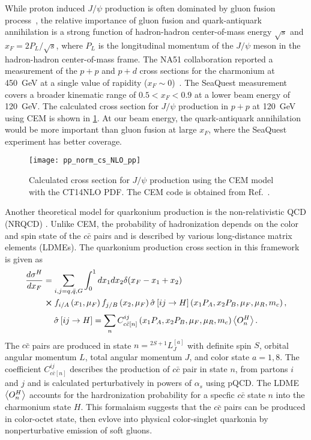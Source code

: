 \documentclass[../main.tex]{subfiles}
\begin{document}
While proton induced $J/\psi$ production is often dominated by gluon fusion
process~\cite{vogt1999}, the relative importance of gluon fusion
and quark-antiquark annihilation is a strong function of hadron-hadron center-of-mass energy $\sqrt{s}$
and $x_F=2P_L/\sqrt{s}$, where $P_L$ is the longitudinal momentum of the $J/\psi$ meson in the
hadron-hadron center-of-mass frame.
The NA51 collaboration reported a measurement of the $p+p$ and $p+d$ cross sections
for the charmonium at \SI{450}{\GeV} at a single value of rapidity ($x_F\sim 0$)~\cite{abreu1998}.
The SeaQuest measurement covers a broader kinematic range of $0.5<x_F<0.9$ at a lower beam energy
of \SI{120}{\GeV}.
The calculated cross section for $J/\psi$ production in $p+p$ at \SI{120}{\GeV} using
CEM is shown in \cref{fig:cem_cs}.
At our beam energy, the quark-antiquark annihilation would be more important than gluon fusion at large $x_F$, where
the SeaQuest experiment has better coverage.
\begin{figure}[h!]
	\centering
	\texttt{[image: pp\_norm\_cs\_NLO\_pp]}
	\caption{Calculated cross section for $J/\psi$ production using the CEM model with the CT14NLO PDF.
		The CEM code is obtained from Ref.~\cite{mangano1993}.}
	\label{fig:cem_cs}
\end{figure}

Another theoretical model for quarkonium production is the non-relativistic
QCD (NRQCD) \cite{bodwin1995}. Unlike CEM, the probability of
hadronization depends on the color and spin state of the $c\bar{c}$ pairs and
is described by various long-distance matrix elements (LDMEs). The quarkonium
production cross section in this framework is given as
\begin{equation}
	\begin{split}
		\frac{d\sigma^H}{dx_F} & =\sum_{i,j = q,\bar{q},G}\int^1_0 dx_1 dx_2 \delta(x_F-x_1+x_2)                                                                                        \\
		                       & \cross f_{i/A}\left(x_1,\mu_F\right)f_{j/B}\left(x_2,\mu_F\right)\hat{\sigma}\left[ij\rightarrow H\right]\left(x_1P_A,x_2P_B,\mu_F,\mu_R , m_c\right),
	\end{split}
\end{equation}
\begin{equation}
	\hat{\sigma}\left[ij\rightarrow H\right]= \sum_n C^{ij}_{c\bar{c}\left[n\right]}\left(x_1P_A,x_2P_B,\mu_F,\mu_R , m_c\right)\expval{O^H_n}.
\end{equation}
The $c\bar{c}$ pairs are produced in state $n={^{2S+1}L_J^{\left[a\right]}}$ with definite spin $S$,
orbital angular momentum $L$, total angular momentum $J$, and color state $a=1,8$.
The coefficient $C^{ij}_{c\bar{c}\left[n\right]}$ describes the production of $c\bar{c}$ pair in state $n$,
from partons $i$ and $j$ and is calculated perturbatively in powers of $\alpha_s$ using pQCD.
The LDME $\expval{O^H_n}$ accounts for the hardronization probability for a specfic $c\bar{c}$ state $n$ into the
charmonium state $H$.
This formalaism suggests that the $c\bar{c}$ pairs can be produced in color-octet state,
then evlove into physical color-singlet quarkonia by nonperturbative emission of soft gluons.
\end{document}
